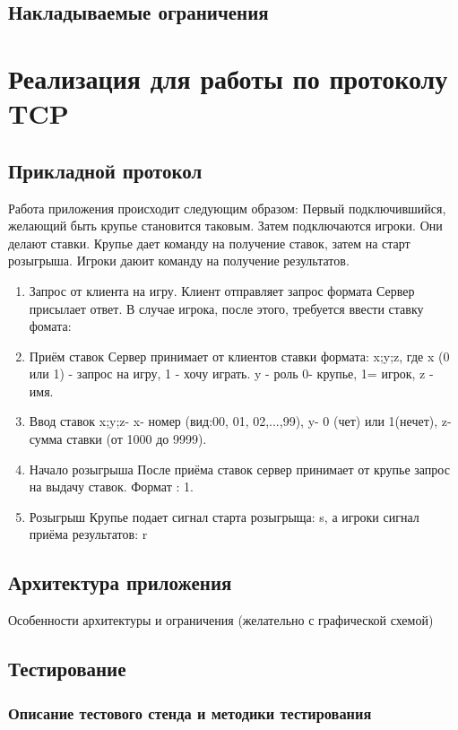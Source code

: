 \documentclass[12pt,a4paper]{report}
\begin{document}
\section{Накладываемые ограничения}

\chapter{Реализация для работы по протоколу TCP}
\section{Прикладной протокол}
\label{protocol_tcp}
Работа приложения происходит следующим образом:
Первый подключившийся, желающий быть крупье становится таковым. Затем подключаются игроки. Они делают ставки. Крупье дает команду на получение ставок, затем на старт розыгрыша. Игроки даюит команду на получение результатов.
\begin{enumerate}
\item{Запрос от клиента на игру.} Клиент отправляет запрос формата 
Сервер присылает ответ. В случае игрока, после этого, требуется ввести ставку фомата:
\item{Приём ставок} Сервер принимает от клиентов ставки формата: x;y;z, где x (0 или 1) - запрос на игру, 1 - хочу играть. y - роль 0- крупье, 1= игрок, z - имя.
\item{Ввод ставок}  x;y;z- x- номер (вид:00, 01, 02,...,99), y- 0 (чет) или 1(нечет), z- сумма ставки (от 1000 до 9999).
\item{Начало розыгрыша} После приёма ставок сервер принимает от крупье запрос на выдачу ставок. Формат : 1.
\item{Розыгрыш} Крупье подает сигнал старта розыгрыща: s, а игроки сигнал  приёма результатов: r 
\end{enumerate}

\section{Архитектура приложения}
Особенности архитектуры и ограничения (желательно с графической схемой)

\section{Тестирование}
\subsection{Описание тестового стенда и методики тестирования}
\end{document}
